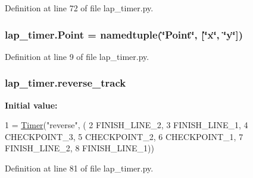 Definition at line 72 of file lap\+\_\+timer.\+py.

\subsubsection[{\texorpdfstring{Point}{Point}}]{\setlength{\rightskip}{0pt plus 5cm}lap\+\_\+timer.\+Point = namedtuple(\char`\"{}Point\char`\"{}, \mbox{[}\char`\"{}x\char`\"{}, \char`\"{}y\char`\"{}\mbox{]})}\hypertarget{namespacelap__timer_ab2bec4f9ed798440bcc6e438d5c76ff0}{}\label{namespacelap__timer_ab2bec4f9ed798440bcc6e438d5c76ff0}


Definition at line 9 of file lap\+\_\+timer.\+py.

\subsubsection[{\texorpdfstring{reverse\+\_\+track}{reverse_track}}]{\setlength{\rightskip}{0pt plus 5cm}lap\+\_\+timer.\+reverse\+\_\+track}\hypertarget{namespacelap__timer_a3df13cfdd738f0a1de56fab6cc242c40}{}\label{namespacelap__timer_a3df13cfdd738f0a1de56fab6cc242c40}
{\bfseries Initial value\+:}
\begin{DoxyCode}
1 = \hyperlink{classlap__timer_1_1_timer}{Timer}(\textcolor{stringliteral}{"reverse"}, (
2     FINISH\_LINE\_2,
3     FINISH\_LINE\_1,
4     CHECKPOINT\_3,
5     CHECKPOINT\_2,
6     CHECKPOINT\_1,
7     FINISH\_LINE\_2,
8     FINISH\_LINE\_1))
\end{DoxyCode}


Definition at line 81 of file lap\+\_\+timer.\+py.

